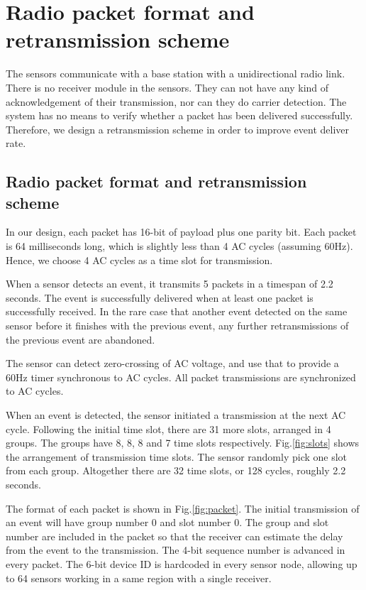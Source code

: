 \chapter{Radio packet format and retransmission scheme}\label{chap4}

The sensors communicate with a base station with a unidirectional radio link. There is no receiver module in the sensors. They can not have any kind of acknowledgement of their transmission, nor can they do carrier detection. The system has no means to verify whether a packet has been delivered successfully. Therefore, we design a retransmission scheme in order to improve event deliver rate. 

\section{Radio packet format and retransmission scheme}

In our design, each packet has 16-bit of payload plus one parity bit. Each packet is 64 milliseconds long, which is slightly less than 4 AC cycles (assuming 60Hz). Hence, we choose 4 AC cycles as a time slot for transmission. 

When a sensor detects an event, it transmits 5 packets in a timespan of 2.2 seconds. The event is successfully delivered when at least one packet is successfully received. In the rare case that another event detected on the same sensor before it finishes with the previous event, any further retransmissions of the previous event are abandoned. 

The sensor can detect zero-crossing of AC voltage, and use that to provide a 60Hz timer synchronous to AC cycles. All packet transmissions are synchronized to AC cycles. 

When an event is detected, the sensor initiated a transmission at the next AC cycle. Following the initial time slot, there are 31 more slots, arranged in 4 groups. The groups have 8, 8, 8 and 7 time slots respectively. Fig.\ref{fig:slots} shows the arrangement of transmission time slots. The sensor randomly pick one slot from each group. Altogether there are 32 time slots, or 128 cycles, roughly 2.2 seconds. 

The format of each packet is shown in Fig.\ref{fig:packet}. The initial transmission of an event will have group number 0 and slot number 0. The group and slot number are included in the packet so that the receiver can estimate the delay from the event to the transmission. The 4-bit sequence number is advanced in every packet. The 6-bit device ID is hardcoded in every sensor node, allowing up to 64 sensors working in a same region with a single receiver. 

